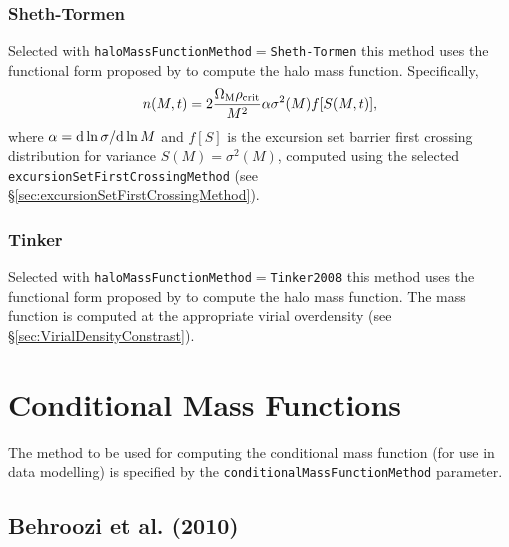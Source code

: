 \subsubsection{Sheth-Tormen}

Selected with {\tt haloMassFunctionMethod}$=${\tt Sheth-Tormen} this method uses the functional form proposed by \cite{sheth_ellipsoidal_2001} to compute the halo mass function. Specifically,
\begin{equation}
n(M,t) = 2 {\Omega_{\rm M} \rho_{\rm crit} \over M^2} \alpha \sigma^2(M) f[S(M,t)],
\end{equation}
where $\alpha = {\rm d}\ln\sigma/{\rm d}\ln M$ and $f[S]$ is the excursion set barrier first crossing distribution for variance $S(M)=\sigma^2(M)$, computed using the selected {\tt excursionSetFirstCrossingMethod} (see \S\ref{sec:excursionSetFirstCrossingMethod}).

\subsubsection{Tinker}

Selected with {\tt haloMassFunctionMethod}$=${\tt Tinker2008} this method uses the functional form proposed by \cite{tinker_towardhalo_2008} to compute the halo mass function. The mass function is computed at the appropriate virial overdensity (see \S\ref{sec:VirialDensityConstrast}).

\section{Conditional Mass Functions}

The method to be used for computing the conditional mass function (for use in data modelling) is specified by the {\tt conditionalMassFunctionMethod} parameter.

\subsection{Behroozi et al. (2010)}

